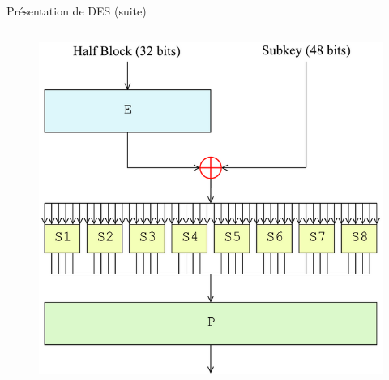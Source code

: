 \documentclass{beamer}
\begin{document}
\begin{frame}{Présentation de DES (suite)}
\begin{columns}
\begin{column}{0.7\textwidth}
\begin{figure}
		\includegraphics[scale=0.3]{Ffunc}
	\end{figure}
	\end{column}
	\end{columns}
\end{frame}
\end{document}

